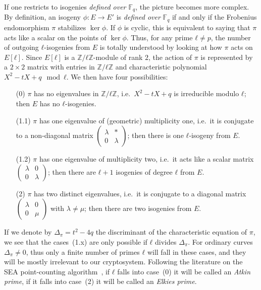 \documentclass{article}
\newcommand{\F}{\mathbb{F}}
\theoremstyle{definition}
\begin{document}
If one restricts to isogenies \emph{defined over $\F_q$}, the picture
becomes more complex.  By definition, an isogeny $ϕ:E→E'$ is
\emph{defined over} $\F_q$ if and only if the Frobenius endomorphism
$π$ stabilizes $\ker ϕ$. If $ϕ$ is cyclic, this is equivalent to
saying that $π$ acts like a scalar on the points of $\ker ϕ$.  Thus,
for any prime $ℓ≠p$, the number of outgoing $ℓ$-isogenies from $E$ is
totally understood by looking at how $π$ acts on $E[ℓ]$. Since $E[ℓ]$
is a $ℤ/ℓℤ$-module of rank $2$, the action of $π$ is represented by a
$2×2$ matrix with entries in $ℤ/ℓℤ$ and characteristic polynomial
$X^2-tX+q\mod ℓ$. We then have four possibilities:
\begin{itemize}
\item[(0)] $π$ has no eigenvalues in $ℤ/ℓℤ$, i.e.\ $X^2-tX+q$ is
  irreducible modulo $ℓ$; then $E$ has no $ℓ$-isogenies.
\item[(1.1)] $π$ has one eigenvalue of (geometric) multiplicity one,
  i.e.\ it is conjugate to a non-diagonal matrix
  $\left(\begin{smallmatrix}λ&*\\0&λ\end{smallmatrix}\right)$; then
  there is one $ℓ$-isogeny from $E$.
\item[(1.2)] $π$ has one eigenvalue of multiplicity two, i.e.\ it acts
  like a scalar matrix
  $\left(\begin{smallmatrix}λ&0\\0&λ\end{smallmatrix}\right)$; then
  there are $ℓ+1$ isogenies of degree $ℓ$ from $E$.
\item[(2)] $π$ has two distinct eigenvalues, i.e.\ it is conjugate to a
  diagonal matrix
  $\left(\begin{smallmatrix}λ&0\\0&μ\end{smallmatrix}\right)$
	with $\lambda\neq\mu$; then
  there are two isogenies from $E$.
\end{itemize}

If we denote by $Δ_π=t^2-4q$ the discriminant of the characteristic
equation of $π$, we see that the cases~(1.x) are only possible if $ℓ$
divides $Δ_π$.  For ordinary curves $Δ_π≠0$, thus only a finite number
of primes $ℓ$ will fall in these cases, and they will be mostly
irrelevant to our cryptosystem. Following the literature on the SEA
point-counting algorithm~\cite{schoof95,todo}, if $ℓ$ falls into
case~(0) it will be called an \emph{Atkin prime}, if it falls into
case~(2) it will be called an \emph{Elkies prime}.
\end{document}
